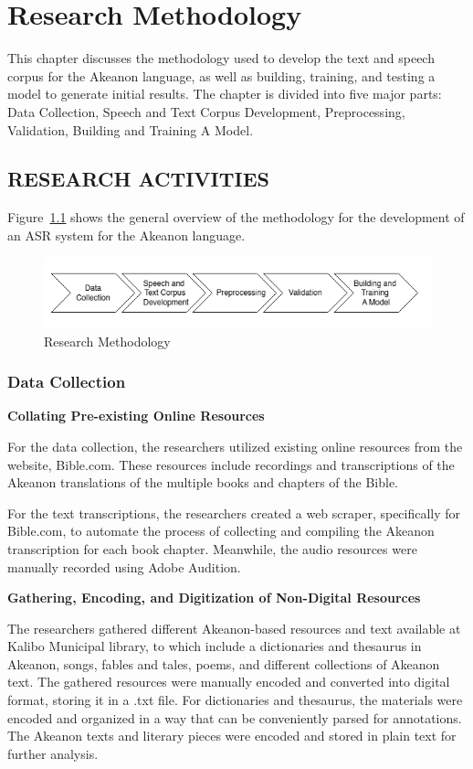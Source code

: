 \chapter{Research Methodology}
This chapter discusses the methodology used to develop the text and speech corpus for the Akeanon language, as well as building, training, and testing a model to generate initial results. The chapter is divided into five major parts: Data Collection, Speech and Text Corpus Development, Preprocessing, Validation, Building and Training A Model.

\section{RESEARCH ACTIVITIES}
Figure~\ref{fig:flowchart} shows the general overview of the methodology for the development of an ASR system for the Akeanon language.

\begin{figure}[h!]
	\centering
	\includegraphics[width=\textwidth]{./figures/flowchart.png}
   \caption{Research Methodology}
	\label{fig:flowchart}
\end{figure}


\subsection{Data Collection}

\textbf{Collating Pre-existing Online Resources}

For the data collection, the researchers utilized existing online resources from the website, Bible.com. These resources include recordings and transcriptions of the Akeanon translations of the multiple books and chapters of the Bible.

For the text transcriptions, the researchers created a web scraper, specifically for Bible.com, to automate the process of collecting and compiling the Akeanon transcription for each book chapter. Meanwhile, the audio resources were manually recorded using Adobe Audition.

\textbf{Gathering, Encoding, and Digitization of Non-Digital Resources}

The researchers gathered different Akeanon-based resources and text available at Kalibo Municipal library, to which include a dictionaries and thesaurus in Akeanon, songs, fables and tales, poems, and different collections of Akeanon text. The gathered resources were manually encoded and converted into digital format, storing it in a .txt file. For dictionaries and thesaurus, the materials were encoded and organized in a way that can be conveniently parsed for annotations. The Akeanon texts and literary pieces were encoded and stored in plain text for further analysis.

